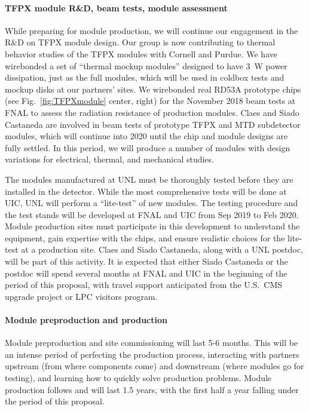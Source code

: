 \paragraph{TFPX module R\&D, beam tests, module assessment}
While preparing for module production, we will continue our engagement in the R\&D on TFPX module design. Our group is now contributing to thermal behavior studies of the TFPX modules with Cornell and Purdue. We have wirebonded a set of ``thermal mockup modules'' designed to have 3~W power dissipation, just as the full modules, which will be used in coldbox tests and mockup disks at our partners' sites. We wirebonded real RD53A prototype chips (see Fig.~\ref{fig:TFPXmodule} center, right) for the November 2018 beam tests at FNAL to assess the radiation resistance of production modules.  
Claes and Siado Castaneda are involved in beam tests of prototype TFPX and MTD subdetector modules, which will continue into 2020 until the chip and module designs are fully settled. In this period, we will produce a number of modules with design variations for electrical, thermal, and mechanical studies.

The modules manufactured at UNL must be thoroughly tested before they are installed in the detector. While the most comprehensive tests will be done at UIC, UNL will perform a ``lite-test'' of new modules. The testing procedure and the test stands will be developed at FNAL and UIC from Sep 2019 to Feb 2020. Module production sites must participate in this development to understand the equipment, gain expertise with the chips, and ensure realistic choices for the lite-test at a production site. Claes and Siado Castaneda, along with a UNL postdoc, will be part of this activity. It is expected that either Siado Castaneda or the postdoc will spend several months at FNAL and UIC in the beginning of the period of this proposal, with travel support anticipated from the U.S.~CMS upgrade project or LPC visitors program.

\paragraph{Module preproduction and production}

Module preproduction and site commissioning will last 5-6 months. 
This will be an intense period of perfecting the production process, interacting with partners upstream (from where components come) and downstream (where modules go for testing), and learning how to quickly solve production problems. 
Module production follows and will last 1.5 years, with the first half a year falling under the period of this proposal.  

